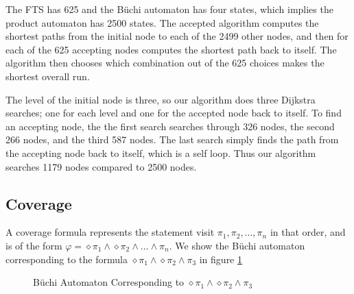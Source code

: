 The FTS has 625 and the B\"uchi automaton has four states, which implies the product automaton has 2500 states. The accepted algorithm computes the shortest paths from the initial node to each of the 2499 other nodes, and then for each of the 625 accepting nodes computes the shortest path back to itself. The algorithm then chooses which combination out of the 625 choices makes the shortest overall run. 

The level of the initial node is three, so our algorithm does three Dijkstra searches; one for each level and one for the accepted node back to itself. To find an accepting node, the the first search searches through 326 nodes, the second 266 nodes, and the third 587 nodes. The last search simply finds the path from the accepting node back to itself, which is a self loop. Thus our algorithm searches 1179 nodes compared to 2500 nodes.  



\subsection{Coverage}
A coverage formula represents the statement visit $\pi_1, \pi_2, \dots, \pi_n$ in that order, and is of the form $\varphi = \diamond \pi_1 \wedge \diamond \pi_2 \wedge \dots \wedge \pi_n$. We show the B\"uchi automaton corresponding to the formula $\diamond \pi_1 \wedge \diamond \pi_2 \wedge \pi_3$ in figure \ref{fig:buchCov}

\begin{figure}
\centering
{}
\caption{B\"uchi Automaton Corresponding to $\diamond \pi_1 \wedge \diamond \pi_2 \wedge \pi_3$}
\label{fig:buchCov}
\end{figure}


